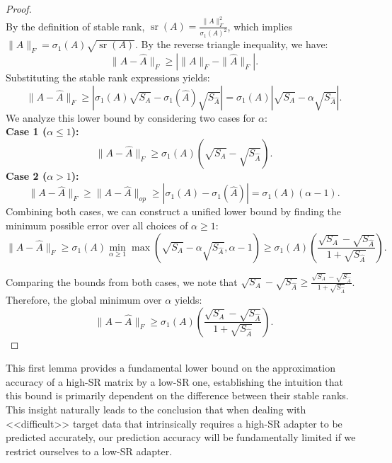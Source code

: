 \documentclass[a4paper,14pt]{extarticle}
\DeclareMathOperator{\sr}{sr}
\begin{document}
    \begin{proof} $~~$\\
        By the definition of stable rank, $\sr(A) = \frac{\|A\|_F^2}{\sigma_1(A)^2}$, which implies $\|A\|_F = \sigma_1(A) \sqrt{\sr(A)}$. 
        By the reverse triangle inequality, we have:
        \[ \|A - \hat{A}\|_F \geqslant \left| \|A\|_F - \|\hat{A}\|_F \right|.\]
        Substituting the stable rank expressions yields:
        \[ \|A - \hat{A}\|_F \geqslant |\sigma_1(A)\sqrt{S_A} - \sigma_1(\hat{A})\sqrt{S_{\hat{A}}}| = \sigma_1(A)\left|\sqrt{S_A} - \alpha\sqrt{S_{\hat{A}}}\right|. \]
        We analyze this lower bound by considering two cases for $\alpha$: \\
        \textbf{Case 1 ($\alpha \leq 1$):} 
            \[ \|A - \hat{A}\|_F \geqslant \sigma_1(A)\left(\sqrt{S_A} - \sqrt{S_{\hat{A}}}\right).\]
        \textbf{Case 2 ($\alpha > 1$):} 
            \[ \|A - \hat{A}\|_F \geqslant \|A - \hat{A}\|_{op} \geqslant |\sigma_1(A) - \sigma_1(\hat{A})| = \sigma_1(A)(\alpha - 1).\]
        Combining both cases, we can construct a unified lower bound by finding the minimum possible error over all choices of $\alpha \geq 1$:
        \[\|A - \hat{A}\|_F \geqslant \sigma_1(A)\min_{\alpha\geqslant 1}\max \left(\sqrt{S_A} - \alpha\sqrt{S_{\hat{A}}}, \alpha - 1\right)\geqslant \sigma_1(A)\left(\frac{\sqrt{S_A} - \sqrt{S_{\hat{A}}}}{1 + \sqrt{S_{\hat{A}}}}\right).\]
        
        Comparing the bounds from both cases, we note that $\sqrt{S_A} - \sqrt{S_{\hat{A}}} \geqslant \frac{\sqrt{S_A} - \sqrt{S_{\hat{A}}}}{1 + \sqrt{S_{\hat{A}}}}$. Therefore, the global minimum over $\alpha$ yields: 
        \[ \|A - \hat{A}\|_F \geqslant \sigma_1(A)\left(\frac{\sqrt{S_A} - \sqrt{S_{\hat{A}}}}{1 + \sqrt{S_{\hat{A}}}}\right). \]
    \end{proof}


    This first lemma provides a fundamental lower bound on the approximation accuracy of a high-SR matrix by a low-SR one, establishing the intuition that this bound is primarily dependent on the difference between their stable ranks. This insight naturally leads to the conclusion that when dealing with <<difficult>> target data that intrinsically requires a high-SR adapter to be predicted accurately, our prediction accuracy will be fundamentally limited if we restrict ourselves to a low-SR adapter. \\
\end{document}
